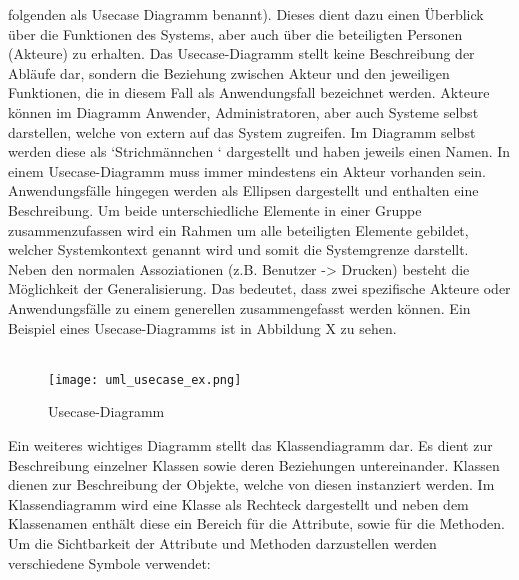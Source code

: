 folgenden als Usecase Diagramm benannt).  Dieses dient dazu einen Überblick über die Funktionen des Systems, aber auch über die beteiligten Personen (Akteure) zu erhalten. Das Usecase-Diagramm stellt keine Beschreibung der Abläufe dar, sondern die Beziehung zwischen Akteur und den jeweiligen Funktionen, die in diesem Fall als Anwendungsfall bezeichnet werden. Akteure können im Diagramm Anwender, Administratoren, aber auch Systeme selbst darstellen, welche von extern auf das System zugreifen. Im Diagramm selbst werden diese als ‘Strichmännchen ‘ dargestellt und haben jeweils einen Namen. In einem Usecase-Diagramm muss immer mindestens ein Akteur vorhanden sein.
Anwendungsfälle hingegen werden als Ellipsen dargestellt und enthalten eine Beschreibung. Um beide unterschiedliche Elemente in einer Gruppe zusammenzufassen wird ein Rahmen um alle beteiligten Elemente gebildet, welcher Systemkontext genannt wird und somit die Systemgrenze darstellt. Neben den normalen Assoziationen (z.B. Benutzer -> Drucken) besteht die Möglichkeit der Generalisierung. Das bedeutet, dass zwei spezifische Akteure oder Anwendungsfälle zu einem generellen zusammengefasst werden können.
Ein Beispiel eines Usecase-Diagramms ist in Abbildung X zu sehen.\\
\\
\begin{figure}[H]
\centering
\texttt{[image: uml\_usecase\_ex.png]}
\caption{Usecase-Diagramm}
\label{fig:show_s1_s2_p1_n1}
\end{figure}
Ein weiteres wichtiges Diagramm stellt das Klassendiagramm dar. Es dient zur Beschreibung einzelner Klassen sowie deren Beziehungen untereinander. Klassen dienen zur Beschreibung der Objekte, welche von diesen instanziert werden. Im Klassendiagramm wird eine Klasse als Rechteck dargestellt und neben dem Klassenamen enthält diese ein Bereich für die Attribute, sowie für die Methoden. Um die Sichtbarkeit der Attribute und Methoden darzustellen werden verschiedene Symbole verwendet:\\


